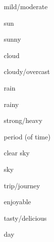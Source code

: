 \begin{flashcard}{\LARGE mild/moderate}
\LARGE {}
\end{flashcard}
\begin{flashcard}{\LARGE sun}
\LARGE {}
\end{flashcard}
\begin{flashcard}{\LARGE sunny}
\LARGE {}
\end{flashcard}
\begin{flashcard}{\LARGE cloud}
\LARGE {}
\end{flashcard}
\begin{flashcard}{\LARGE cloudy/overcast}
\LARGE {}
\end{flashcard}
\begin{flashcard}{\LARGE rain}
\LARGE {}
\end{flashcard}
\begin{flashcard}{\LARGE rainy}
\LARGE {}
\end{flashcard}
\begin{flashcard}{\LARGE strong/heavy}
\LARGE {}
\end{flashcard}
\begin{flashcard}{\LARGE period (of time)}
\LARGE {}
\end{flashcard}
\begin{flashcard}{\LARGE clear sky}
\LARGE {}
\end{flashcard}
\begin{flashcard}{\LARGE sky}
\LARGE {}
\end{flashcard}
\begin{flashcard}{\LARGE trip/journey}
\LARGE {}
\end{flashcard}
\begin{flashcard}{\LARGE enjoyable}
\LARGE {}
\end{flashcard}
\begin{flashcard}{\LARGE tasty/delicious}
\LARGE {}
\end{flashcard}
\begin{flashcard}{\LARGE day}
\LARGE {}
\end{flashcard}
